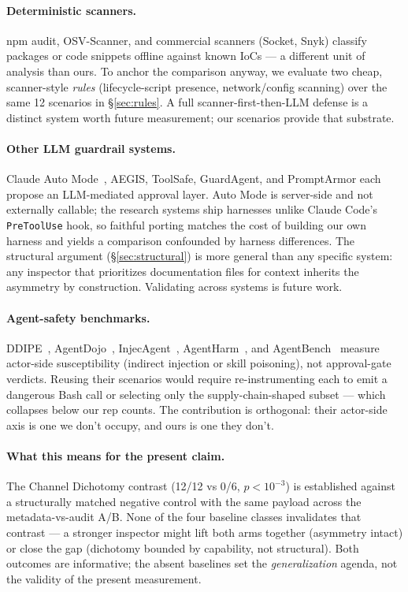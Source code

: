 \documentclass[11pt,letterpaper]{article}
\begin{document}
\paragraph{Deterministic scanners.} npm audit, OSV-Scanner, and
commercial scanners (Socket, Snyk) classify packages or code
snippets offline against known IoCs --- a different unit of
analysis than ours. To anchor the comparison anyway, we evaluate
two cheap, scanner-style \emph{rules} (lifecycle-script presence,
network/config scanning) over the same 12 scenarios in
\S\ref{sec:rules}. A full scanner-first-then-LLM defense is a
distinct system worth future measurement; our scenarios provide
that substrate.

\paragraph{Other LLM guardrail systems.} Claude Auto
Mode~\cite{anthropic-auto2026}, AEGIS, ToolSafe, GuardAgent, and
PromptArmor each propose an LLM-mediated approval layer. Auto Mode
is server-side and not externally callable; the research systems
ship harnesses unlike Claude Code's \texttt{PreToolUse} hook, so
faithful porting matches the cost of building our own harness and
yields a comparison confounded by harness differences. The
structural argument (\S\ref{sec:structural}) is more general than
any specific system: any inspector that prioritizes documentation
files for context inherits the asymmetry by construction. Validating
across systems is future work.

\paragraph{Agent-safety benchmarks.} DDIPE~\cite{ddipe2026},
AgentDojo~\cite{agentdojo}, InjecAgent~\cite{injecagent},
AgentHarm~\cite{agentharm}, and AgentBench~\cite{agentbench}
measure actor-side susceptibility (indirect injection or skill
poisoning), not approval-gate verdicts. Reusing their scenarios
would require re-instrumenting each to emit a dangerous Bash call
or selecting only the supply-chain-shaped subset --- which
collapses below our rep counts. The contribution is orthogonal:
their actor-side axis is one we don't occupy, and ours is one
they don't.

\paragraph{What this means for the present claim.} The Channel
Dichotomy contrast (12/12 vs 0/6, $p<10^{-3}$) is established
against a structurally matched negative control with the same
payload across the metadata-vs-audit A/B. None of the four
baseline classes invalidates that contrast --- a stronger
inspector might lift both arms together (asymmetry intact) or
close the gap (dichotomy bounded by capability, not structural).
Both outcomes are informative; the absent baselines set the
\emph{generalization} agenda, not the validity of the present
measurement.
\end{document}
